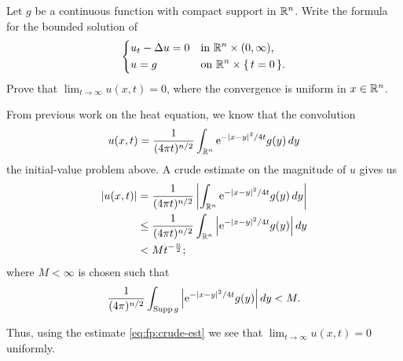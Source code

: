 \begin{problem}
  Let \(g\) be a continuous function with compact support in
  \(\mathbb{R}^n\). Write the formula for the bounded solution of
  \[
    \left\{
      \begin{aligned}
        &u_t-\Delta u=0&&\text{in \(\mathbb{R}^n\times(0,\infty)\),}\\
        &u=g&&\text{on \(\mathbb{R}^n\times\{\,t=0\,\}\).}
      \end{aligned}
    \right.
  \]
  Prove that \(\lim_{t\to\infty} u(x,t)=0\), where the convergence is
  uniform in \(x\in\mathbb{R}^n\).
\end{problem}
\begin{solution*}
  From previous work on the heat equation, we know that the convolution
  \[
    u(x,t)
    =\frac{1}{(4\pi t)^{n/2}}%
    \int_{\R^n}\rme^{-|x-y|^2/4t}g(y)\diff y
  \]
  the initial-value problem above. A crude estimate on the magnitude of
  \(u\) gives us
  \begin{equation}
    \label{eq:fp:crude-est}
    \begin{aligned}
      |u(x,t)| &=%
      \frac{1}{(4\pi t)^{n/2}}%
      \left| \int_{\R^n}\rme^{-|x-y|^2/4t}g(y)\diff y
      \right|\\
      &\leq%
      \frac{1}{(4\pi t)^{n/2}}
      \int_{\R^n}\left|\rme^{-|x-y|^2/4t}g(y)\right|\diff y\\
      &<M t^{-\frac{n}{2}};
    \end{aligned}
  \end{equation}
  where \(M<\infty\) is chosen such that
  \[
    \frac{1}{(4\pi)^{n/2}}
    \int_{\operatorname{Supp} g}\left|\mathrm{e}^{-|x-y|^2/4t}g(y)\right|\mathop{}\!d y
    <M.
  \]

  Thus, using the estimate \eqref{eq:fp:crude-est} we see that
  \(\lim_{t\to\infty}u(x,t)=0\) uniformly.
\end{solution*}

